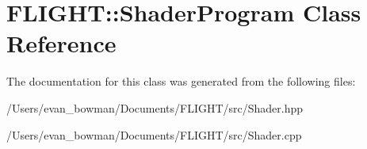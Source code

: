 \hypertarget{class_f_l_i_g_h_t_1_1_shader_program}{}\section{F\+L\+I\+G\+HT\+:\+:Shader\+Program Class Reference}
\label{class_f_l_i_g_h_t_1_1_shader_program}


The documentation for this class was generated from the following files\+:\begin{DoxyCompactItemize}
\item 
/\+Users/evan\+\_\+bowman/\+Documents/\+F\+L\+I\+G\+H\+T/src/Shader.\+hpp\item 
/\+Users/evan\+\_\+bowman/\+Documents/\+F\+L\+I\+G\+H\+T/src/Shader.\+cpp\end{DoxyCompactItemize}
